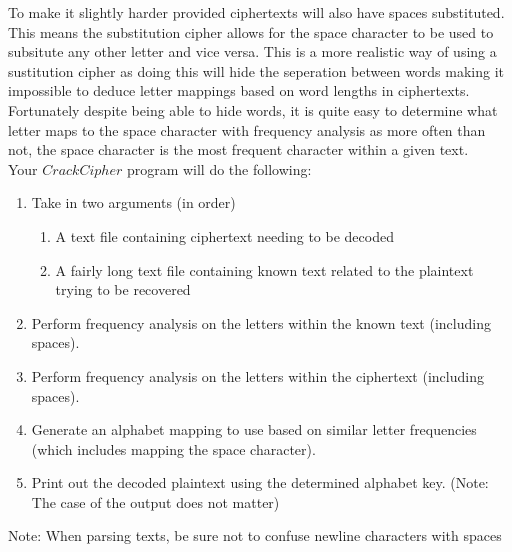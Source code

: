 \documentclass{article}
\begin{document}
To make it slightly harder provided ciphertexts will also have spaces substituted.  This means the substitution cipher allows for the space character to be used to subsitute any other letter and vice versa. This is a more realistic way of using a sustitution cipher as doing this will hide the seperation between words making it impossible to deduce letter mappings based on word lengths in ciphertexts. Fortunately despite being able to hide words, it is quite easy to determine what letter maps to the space character with frequency analysis as more often than not, the space character is the most frequent character within a given text.\\

\noindent Your $CrackCipher$ program will do the following:
\begin{enumerate}
\item Take in two arguments (in order)
\begin{enumerate}
	\item A text file containing ciphertext needing to be decoded
	\item A fairly long text file containing known text related to the plaintext trying to be recovered
\end{enumerate}
\item Perform frequency analysis on the letters within the known text (including spaces).
\item Perform frequency analysis on the letters within the ciphertext (including spaces).
\item Generate an alphabet mapping to use based on similar letter frequencies (which includes mapping the space character).
\item Print out the decoded plaintext using the determined alphabet key. (Note: The case of the output does not matter)
\end{enumerate}

Note: When parsing texts, be sure not to confuse newline characters with spaces
\end{document}
